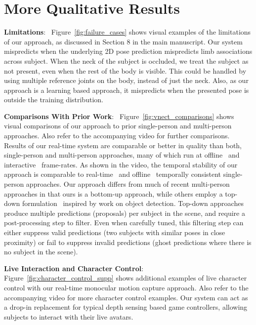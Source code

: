 \documentclass[acmtog,authorversion]{acmart}
\newcommand{\parahead}[1]{\textbf{#1}:\ }
\begin{document}
\section{More Qualitative Results}
\parahead{Limitations}
Figure~\ref{fig:failure_cases} shows visual examples of the limitations of our approach, as discussed in Section 8 in the main manuscript. Our system mispredicts when the underlying 2D pose prediction mispredicts limb associations across subject. When the neck of the subject is occluded, we treat the subject as not present, even when the rest of the body is visible. This could be handled by using multiple reference joints on the body, instead of just the neck. 
Also, as our approach is a learning based approach, it mispredicts when the presented pose is outside the training distribution. 

\parahead{Comparisons With Prior Work}
Figure~\ref{fig:vnect_comparisons} shows visual comparisons of our approach to prior single-person and multi-person approaches. Also refer to the accompanying video for further comparisons. Results of our real-time system are comparable or better in quality than both, single-person and multi-person approaches, many of which run at offline~\cite{Moon_2019_ICCV_3DMPPE,humanMotionKanazawa19,kanazawa2018endtoend,mehta_3dv18} and interactive~\cite{rogez_lcrpp,dabral2019multi} frame-rates. As shown in the video, the temporal stability of our approach is comparable to real-time~\citep{VNect_SIGGRAPH2017} and offline~\cite{humanMotionKanazawa19} temporally consistent single-person approaches. Our approach differs from much of recent multi-person approaches in that ours is a bottom-up approach, while others employ a top-down formulation~\cite{rogez_lcrpp,rogez_lcr_cvpr17,dabral2019multi,Moon_2019_ICCV_3DMPPE} inspired by work on object detection. Top-down approaches produce multiple predictions (proposals) per subject in the scene, and require a post-processing step to filter. Even when carefully tuned, this filtering step can either suppress valid predictions (two subjects with similar poses in close proximity) or fail to suppress invalid predictions (ghost predictions where there is no subject in the scene). 


\parahead{Live Interaction and Character Control}
Figure~\ref{fig:character_control_supp} shows additional examples of live character control with our real-time monocular motion capture approach. Also refer to the accompanying video for more character control examples. Our system can act as a drop-in replacement for typical depth sensing based game controllers, allowing subjects to interact with their live avatars. 
\end{document}
